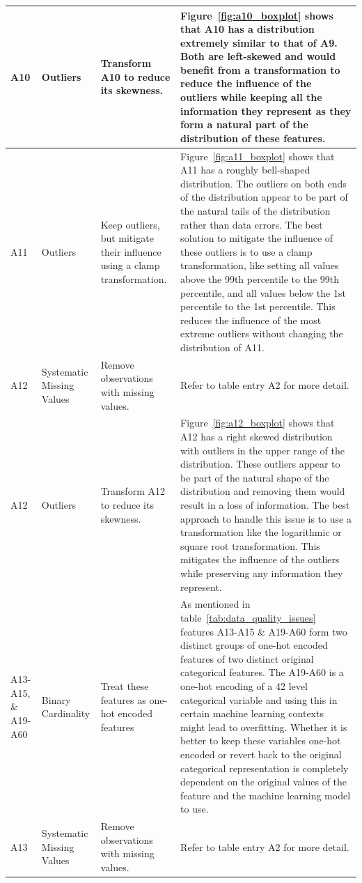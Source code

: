 \documentclass[11pt]{report}
\begin{document}
\begin{longtable}{p{2cm}p{3cm}p{4cm}p{6cm}}
\midrule
A10 & Outliers & Transform A10 to reduce its skewness. &  Figure~\ref{fig:a10_boxplot} shows that A10 has a distribution extremely similar to that of A9. Both are left-skewed and would benefit from a transformation to reduce the influence of the outliers while keeping all the information they represent as they form a natural part of the distribution of these features. \\
\midrule
A11 & Outliers & Keep outliers, but mitigate their influence using a clamp transformation. & Figure~\ref{fig:a11_boxplot} shows that A11 has a roughly bell-shaped distribution. The outliers on both ends of the distribution appear to be part of the natural tails of the distribution rather than data errors. The best solution to mitigate the influence of these outliers is to use a clamp transformation, like setting all values above the 99th percentile to the 99th percentile, and all values below the 1st percentile to the 1st percentile. This reduces the influence of the most extreme outliers without changing the distribution of A11. \\
\midrule
A12 & Systematic Missing Values & Remove observations with missing values. & Refer to table entry A2 for more detail. \\
\midrule
A12 & Outliers & Transform A12 to reduce its skewness. & Figure~\ref{fig:a12_boxplot} shows that A12 has a right skewed distribution with outliers in the upper range of the distribution. These outliers appear to be part of the natural shape of the distribution and removing them would result in a loss of information. The best approach to handle this issue is to use a transformation like the logarithmic or square root transformation. This mitigates the influence of the outliers while preserving any information they represent. \\
\midrule
A13-A15, \& A19-A60 & Binary Cardinality & Treat these features as one-hot encoded features & As mentioned in table~\ref{tab:data_quality_issues} features A13-A15 \& A19-A60 form two distinct groups of one-hot encoded features of two distinct original categorical features. The A19-A60 is a one-hot encoding of a 42 level categorical variable and using this in certain machine learning contexts might lead to overfitting. Whether it is better to keep these variables one-hot encoded or revert back to the original categorical representation is completely dependent on the original values of the feature and the machine learning model to use. \\
\midrule
A13 & Systematic Missing Values & Remove observations with missing values. & Refer to table entry A2 for more detail. \\

\end{longtable}
\end{document}
